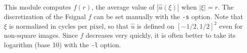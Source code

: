This module computes $f(r)$, the average value of $|\hat u(\xi)|$ when
$|\xi|=r$. The discretization of the Fsignal $f$ can be set manually
with the \verb+-s+ option.
Note that $\xi$ is normalized in cycles per pixel, so that
$\hat u$ is defined on $[-1/2,1/2]^2$ even for non-square images.
Since $f$ decreases very quickly, it is often better to take
its logarithm (base 10) with the \verb+-l+ option.


